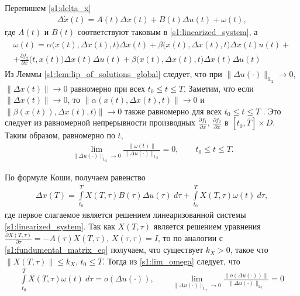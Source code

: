 \documentclass[../main.tex]{subfiles}
\begin{document}
Перепишем \eqref{s1:delta_x}
\begin{gather*}%
    \Delta \dot{x}(t) =
    A(t) \Delta x(t)  + 
    B(t) \Delta u(t)  + 
    \omega(t),
\end{gather*}
где $A(t)$ и $B(t)$ соответствуют таковым в \eqref{s1:linearized_system}, а
\begin{gather*}
\begin{gathered}
    \omega(t) = 
    \alpha\big(x(t),\Delta x(t), t\big) \Delta x(t)  + 
    \beta\big(x(t),\Delta x(t), t\big)  \Delta x(t) u(t)  + \\ +
    \frac{\partial f_2}{\partial x} \Big(t, x(t)\Big) \Delta x(t) \Delta u(t) + 
    \beta\Big(x(t),\Delta x(t), t\Big) \Delta x(t) \Delta u(t) 
\end{gathered}    
\end{gather*}
Из Леммы \ref{s1:lem:lip_of_solutions_global} следует, что при $\|\Delta u(\cdot)\|_{\mathbb{L}_2} \to 0$, $\|\Delta x(t)\| \to 0$ равномерно при всех $t_0 \leqslant t \leqslant T$.
Заметим, что если $\|\Delta x(t)\| \to 0$, то $ \left\|  \alpha(x(t),\Delta x(t), t) \right\|  \to 0 $ и $ \left\|  \beta(x(t)),\Delta x(t), t) \right\|  \to 0 $ также равномерно для всех  $ t_0 \leqslant t \leqslant T $ .
Это следует из равномерной непрерывности производных $\frac{\partial f_1}{\partial x}$, $\frac{\partial f_2}{\partial x}$ в $[t_0, \overline{T}] \times D$.
Таким образом, равномерно по $t$,
\begin{gather}\label{s1:lim_omega}
    \lim\limits_{\|\Delta u(\cdot) \|_{\mathbb{L}_2} \to 0}  \frac{ \| \omega(t) \| }{\|\Delta u(\cdot) \|_{\mathbb{L}_2}}  = 0, \qquad  t_0 \leqslant t \leqslant T .
\end{gather}
    
По формуле Коши, получаем равенство
\begin{gather*}
    \Delta x(T) = \int\limits_{t_0}^{T} X(T, \tau) B(\tau) \Delta u(\tau) \ d\tau + \int\limits_{t_0}^{T}  X(T, \tau) \omega(t) \ d\tau,
\end{gather*}
где первое слагаемое является решением линеаризованной системы \eqref{s1:linearized_system}.
Так как $X(T, \tau) $ является решением уравнения $\frac{\partial X(T, \tau) }{\partial \tau} = -A(\tau)X(T, \tau)$, $X(\tau, \tau) = I$, то по аналогии с \eqref{s1:fundumental_matrix_eq}  получаем, что существует $k_X > 0$, такое что $\|X(T, \tau) \| \leqslant k_X$, $t_0 \leqslant \overline{T} $.
Тогда из \eqref{s1:lim_omega} следует, что 
\begin{gather*}
    \int\limits_{t_0}^{T}  X(T, \tau) \omega(t) \ d\tau  = o(\Delta u(\cdot)), \qquad \lim\limits_{\|\Delta u(\cdot) \|_{\mathbb{L}_2} \to 0}  \frac{ \| o(\Delta u(\cdot)) \| }{\|\Delta u(\cdot) \|_{\mathbb{L}_2}}  = 0
\end{gather*}
    
\end{document}

